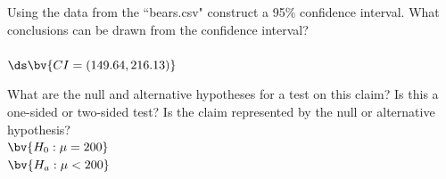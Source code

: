 \documentclass{article}
\begin{document}
\begin{flushleft}
\begin{enumalpha}
\newpage
\item Using the data from the ``bears.csv" construct a 95\% confidence interval.  What conclusions can be drawn from the confidence interval?\\
\bigskip
{}\\
$\ds \bv{CI = (149.64, 216.13)}$\\

\bigskip
{}
\vspace{0.5in}


\item What are the null and alternative hypotheses for a test on this claim? Is this a one-sided or two-sided test? Is the claim represented by the null or alternative hypothesis?\\
\medskip
$\bv{H_0: \mu = 200}$\\
$\bv{H_a: \mu < 200}$\\
\\
\vspace{.5in}
\end{enumalpha}



\end{flushleft}
\end{document}
